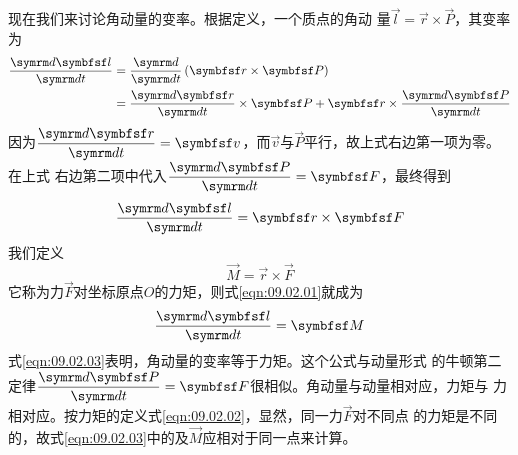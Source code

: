 \section[力矩]{}\label{sec:09.02}

现在我们来讨论角动量的变率。根据定义，一个质点的角动
量$ \vec{l} = \vec{r} \times \vec{P} $，其变率为
\\
\begin{equation*}
  \begin{split}
    \frac { \dif \vec{l} } { \dif t } &= \frac { \dif } { \dif t } \left( \vec{r} \times \vec{P} \right) \\
    &= \frac { \dif \vec{r} } { \dif t } \times \vec{P} + \vec{r} \times \frac { \dif \vec{P} } { \dif t }
  \end{split}
\end{equation*}
因为$ \dfrac { \dif \vec{r} } { \dif t } = \vec{v} $，而$\vec{v}$与$\vec{P}$平行，故上式右边第一项为零。在上式
右边第二项中代入$\dfrac { \dif \vec{P} } { \dif t } = \vec{F}$，最终得到
\begin{equation}\label{eqn:09.02.01}
  \frac { \dif \vec{l} } { \dif t } = \vec{r} \times \vec{F}
\end{equation}
我们定义
\begin{equation}\label{eqn:09.02.02}
  \vec{M} = \vec{r} \times \vec{F}
\end{equation}
它称为力$\vec{F}$对坐标原点$O$的力矩，则式\eqref{eqn:09.02.01}就成为
\begin{equation}\label{eqn:09.02.03}
  \frac { \dif \vec{l} } { \dif t } = \vec{M}
\end{equation}
式\eqref{eqn:09.02.03}表明，角动量的变率等于力矩。这个公式与动量形式
的牛顿第二定律$ \dfrac { \dif \vec{P} } { \dif t } = \vec{F} $很相似。角动量与动量相对应，力矩与
力相对应。按力矩的定义\lhbrak 式\eqref{eqn:09.02.02}\rhbrak ，显然，同一力$\vec{F}$对不同点
的力矩是不同的，故式\eqref{eqn:09.02.03}中的及$\vec{M}$应相对于同一点来计算。

